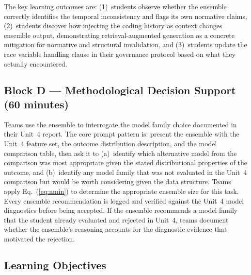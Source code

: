 The key learning outcomes are: (1)~students observe whether the
ensemble correctly identifies the temporal inconsistency and flags
its own normative claims, (2)~students discover how injecting the
coding history as context changes ensemble output, demonstrating
retrieval-augmented generation as a concrete mitigation for
normative and structural invalidation, and (3)~students update the
race variable handling clause in their governance protocol based
on what they actually encountered.

\subsection*{Block D --- Methodological Decision Support
(60 minutes)}

Teams use the ensemble to interrogate the model family choice
documented in their Unit~4 report. The core prompt pattern
is: present the ensemble with the Unit~4 feature set, the
outcome distribution description, and the model comparison
table, then ask it to (a)~identify which alternative model
from the comparison was most appropriate given the stated
distributional properties of the outcome, and (b)~identify
any model family that was not evaluated in the Unit~4
comparison but would be worth considering given the data
structure. Teams apply Eq.~(\ref{eq:nmin}) to determine
the appropriate ensemble size for this task. Every ensemble
recommendation is logged and verified against the Unit~4
model diagnostics before being accepted. If the ensemble
recommends a model family that the student already
evaluated and rejected in Unit~4, teams document whether
the ensemble's reasoning accounts for the diagnostic
evidence that motivated the rejection.

\subsection{Learning Objectives}

